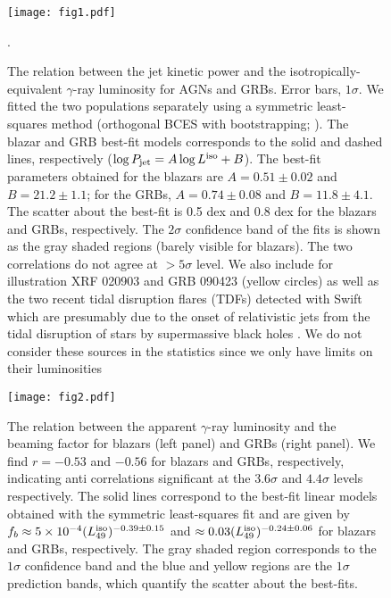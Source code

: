 \documentclass[12pt]{article}
\begin{document}
\clearpage

\begin{figure}[!t]
\centering
\texttt{[image: fig1.pdf]}	%
\caption{The relation between the jet kinetic power and the isotropically-equivalent $\gamma$-ray luminosity for AGNs and GRBs. Error bars, $1\sigma$. 
%
We fitted the two populations separately using a symmetric least-squares method (orthogonal BCES with bootstrapping; ). The blazar and GRB best-fit models corresponds to the solid and dashed lines, respectively ($\log P_{\rm jet} = A \log L^{\rm iso} + B$). The best-fit parameters obtained for the blazars are $A=0.51 \pm 0.02$ and $B=21.2 \pm 1.1$; for the GRBs, $A=0.74 \pm 0.08$ and $B=11.8 \pm 4.1$. The scatter about the best-fit is 0.5 dex and 0.8 dex for the blazars and GRBs, respectively.
The $2\sigma$ confidence band of the fits is shown as the gray shaded regions (barely visible for blazars). The two correlations do not agree at $>5\sigma$ level.
%
We also include for illustration XRF 020903 and GRB 090423 (yellow circles) as well as the two recent tidal disruption flares (TDFs) detected with Swift which are presumably due to the onset of relativistic jets from the tidal disruption of stars by supermassive black holes \cite{tdfs}. We do not consider these sources in the statistics since we only have limits on their luminosities}.
\label{fig:main}
\end{figure}


\begin{figure}[!t]
\centering
\texttt{[image: fig2.pdf]}	%
\caption{The relation between the apparent $\gamma$-ray luminosity and the beaming factor for blazars (left panel) and GRBs (right panel). 
%
We find $r=-0.53$ and $-0.56$ for blazars and GRBs, respectively, indicating anti correlations significant at the $3.6\sigma$ and $4.4\sigma$ levels respectively. The solid lines correspond to the best-fit linear models obtained with the symmetric least-squares fit and are given by $f_b \approx 5 \times 10^{-4} (L_{49}^{\rm iso})^{-0.39 \pm 0.15}$ and $\approx 0.03 (L_{49}^{\rm iso})^{-0.24 \pm 0.06}$ for blazars and GRBs, respectively.
%
The gray shaded region corresponds to the $1\sigma$ confidence band and the blue and yellow regions are the $1\sigma$ prediction bands, which quantify the scatter about the best-fits.}
\label{fig:beaming}
\end{figure}
\end{document}
